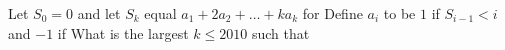 Let $S_0=0$ and let $S_k$ equal $a_1+2a_2+\ldots+ka_k$ for   Define $a_i$ to be $1$ if $S_{i-1}<i$ and $-1$ if   What is the largest $k\leq 2010$ such that 